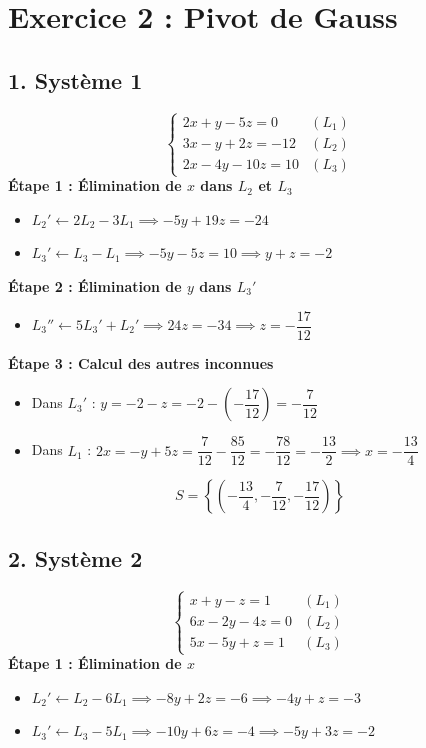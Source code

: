 \documentclass[12pt,a4paper]{article}
\begin{document}
\vspace{0.3cm}

\section*{Exercice 2 : Pivot de Gauss}

\subsection*{1. Système 1}
\[
\begin{cases}
2x + y - 5z = 0 & (L_1) \\
3x - y + 2z = -12 & (L_2) \\
2x - 4y - 10z = 10 & (L_3)
\end{cases}
\]
\textbf{Étape 1 : Élimination de $x$ dans $L_2$ et $L_3$}
\begin{itemize}[label=$\bullet$]
    \item $L_2' \leftarrow 2L_2 - 3L_1 \implies -5y + 19z = -24$
    \item $L_3' \leftarrow L_3 - L_1 \implies -5y - 5z = 10 \implies y + z = -2$
\end{itemize}

\textbf{Étape 2 : Élimination de $y$ dans $L_3'$}
\begin{itemize}[label=$\bullet$]
    \item $L_3'' \leftarrow 5L_3' + L_2' \implies 24z = -34 \implies z = -\dfrac{17}{12}$
\end{itemize}

\textbf{Étape 3 : Calcul des autres inconnues}
\begin{itemize}[label=$\bullet$]
    \item Dans $L_3'$ : $y = -2 - z = -2 - \left(-\dfrac{17}{12}\right) = -\dfrac{7}{12}$
    \item Dans $L_1$ : $2x = -y + 5z = \dfrac{7}{12} - \dfrac{85}{12} = -\dfrac{78}{12} = -\dfrac{13}{2} \implies x = -\dfrac{13}{4}$
\end{itemize}
\[
S = \left\{\left(-\frac{13}{4}, -\frac{7}{12}, -\frac{17}{12}\right)\right\}
\]

\subsection*{2. Système 2}
\[
\begin{cases}
x + y - z = 1 & (L_1) \\
6x - 2y - 4z = 0 & (L_2) \\
5x - 5y + z = 1 & (L_3)
\end{cases}
\]
\textbf{Étape 1 : Élimination de $x$}
\begin{itemize}[label=$\bullet$]
    \item $L_2' \leftarrow L_2 - 6L_1 \implies -8y + 2z = -6 \implies -4y + z = -3$
    \item $L_3' \leftarrow L_3 - 5L_1 \implies -10y + 6z = -4 \implies -5y + 3z = -2$
\end{itemize}
\end{document}
